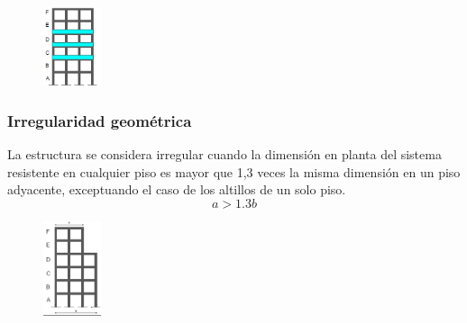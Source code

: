 \documentclass{report}
\begin{document}
\begin{figure}[h]
    \centering
    \includegraphics[width=0.15\textwidth]{imagenes/distribucion_de_masa.png}
\end{figure}

\subsubsection{Irregularidad geom\'etrica }
La estructura se considera irregular cuando la dimensi\'on en planta del sistema resistente en cualquier piso 
es mayor que 1,3 veces la misma dimensi\'on en un piso adyacente, exceptuando el caso de los altillos de un solo piso.
$$a > 1.3b$$

\begin{figure}[h]
    \centering
    \includegraphics[width=0.15\textwidth]{imagenes/irregularidad_geometrica.png}
\end{figure}
\end{document}
